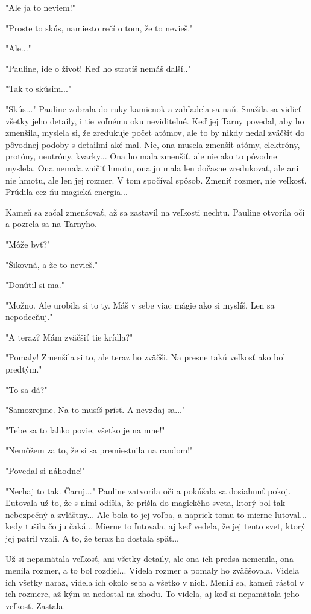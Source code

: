 \documentclass{book}
\begin{document}
"$ $Ale ja to neviem!"$ $ 

"$ $Proste to skús, namiesto rečí o tom, že to nevieš."$ $ 

"$ $Ale..."$ $ 

"$ $Pauline, ide o život! Keď ho stratíš nemáš ďalší.."$ $ 

"$ $Tak to skúsim..."$ $ 

"$ $Skús..."$ $  Pauline zobrala do ruky kamienok a zahľadela sa naň. Snažila sa vidieť všetky jeho detaily, i tie voľnému oku neviditeľné. Keď jej Tarny povedal, aby ho zmenšila, myslela si, že zredukuje počet atómov, ale to by nikdy nedal zväčšiť do pôvodnej podoby s detailmi aké mal. Nie, ona musela zmenšiť atómy, elektróny, protóny, neutróny, kvarky... Ona ho mala zmenšiť, ale nie ako to pôvodne myslela. Ona nemala zničiť hmotu, ona ju mala len dočasne zredukovať, ale ani nie hmotu, ale len jej rozmer. V tom spočíval spôsob. Zmeniť rozmer, nie veľkosť. Prúdila cez ňu magická energia...

Kameň sa začal zmenšovať, až sa zastavil na veľkosti nechtu. Pauline otvorila oči a pozrela sa na Tarnyho.

"$ $Môže byť?"$ $ 

"$ $Šikovná, a že to nevieš."$ $ 

"$ $Donútil si ma."$ $ 

"$ $Možno. Ale urobila si to ty. Máš v sebe viac mágie ako si myslíš. Len sa nepodceňuj."$ $ 

"$ $A teraz? Mám zväčšiť tie krídla?"$ $ 

"$ $Pomaly! Zmenšila si to, ale teraz ho zväčši. Na presne takú veľkosť ako bol predtým."$ $ 

"$ $To sa dá?"$ $ 

"$ $Samozrejme. Na to musíš prísť. A nevzdaj sa..."$ $ 

"$ $Tebe sa to ľahko povie, všetko je na mne!"$ $ 

"$ $Nemôžem za to, že si sa premiestnila na random!"$ $ 

"$ $Povedal si náhodne!"$ $ 

"$ $Nechaj to tak. Čaruj..."$ $  Pauline zatvorila oči a pokúšala sa dosiahnuť pokoj. Ľutovala už to, že s nimi odišla, že prišla do magického sveta, ktorý bol tak nebezpečný a zvláštny... Ale bola to jej voľba, a napriek tomu to mierne ľutoval... kedy tušila čo ju čaká... Mierne to ľutovala, aj keď vedela, že jej tento svet, ktorý jej patril vzali. A to, že teraz ho dostala späť...

Už si nepamätala veľkosť, ani všetky detaily, ale ona ich predsa nemenila, ona menila rozmer, a to bol rozdiel... Videla rozmer a pomaly ho zväčšovala. Videla ich všetky naraz, videla ich okolo seba a všetko v nich. Menili sa, kameň rástol v ich rozmere, až kým sa nedostal na zhodu. To videla, aj keď si nepamätala jeho veľkosť. Zastala.
\end{document}
